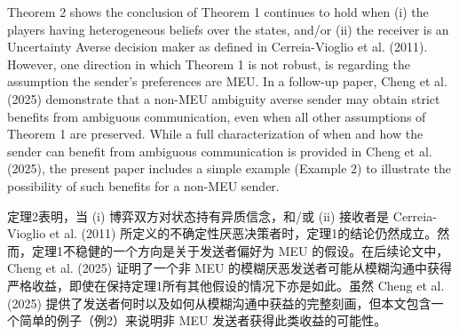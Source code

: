 \documentclass[12pt,a4paper]{article}
\theoremstyle{definition}
\theoremstyle{remark}
\newenvironment{original}{%
    \par\medskip\noindent%
    \begin{tcolorbox}[%
        colback=white,%
        colframe=black!50,%
        title=\textbf{Original English},%
        fonttitle=\small\bfseries,%
        left=0pt, right=0pt, top=2pt, bottom=2pt,%
        boxrule=0.5pt,%
        arc=0pt,%
        outer arc=0pt%
    ]%
    \small%
}{%
    \end{tcolorbox}%
}
\newenvironment{translation}{%
    \par\smallskip\noindent%
    \begin{tcolorbox}[%
        colback=blue!3!white,%
        colframe=blue!40!black,%
        title=\textbf{中文翻译},%
        fonttitle=\small\bfseries,%
        left=0pt, right=0pt, top=2pt, bottom=2pt,%
        boxrule=0.5pt,%
        arc=0pt,%
        outer arc=0pt%
    ]%
    \small\color{blue!60!black}%
}{%
    \end{tcolorbox}\medskip%
}
\begin{document}
\begin{original}
Theorem 2 shows the conclusion of Theorem 1 continues to hold when (i) the players having heterogeneous beliefs over the states, and/or (ii) the receiver is an Uncertainty Averse decision maker as defined in Cerreia-Vioglio et al. (2011). However, one direction in which Theorem 1 is not robust, is regarding the assumption the sender's preferences are MEU. In a follow-up paper, Cheng et al. (2025) demonstrate that a non-MEU ambiguity averse sender may obtain strict benefits from ambiguous communication, even when all other assumptions of Theorem 1 are preserved. While a full characterization of when and how the sender can benefit from ambiguous communication is provided in Cheng et al. (2025), the present paper includes a simple example (Example 2) to illustrate the possibility of such benefits for a non-MEU sender.
\end{original}
\begin{translation}
定理2表明，当 (i) 博弈双方对状态持有异质信念，和/或 (ii) 接收者是 Cerreia-Vioglio et al. (2011) 所定义的不确定性厌恶决策者时，定理1的结论仍然成立。然而，定理1不稳健的一个方向是关于发送者偏好为 MEU 的假设。在后续论文中，Cheng et al. (2025) 证明了一个非 MEU 的模糊厌恶发送者可能从模糊沟通中获得严格收益，即使在保持定理1所有其他假设的情况下亦是如此。虽然 Cheng et al. (2025) 提供了发送者何时以及如何从模糊沟通中获益的完整刻画，但本文包含一个简单的例子（例2）来说明非 MEU 发送者获得此类收益的可能性。
\end{translation}
\end{document}
